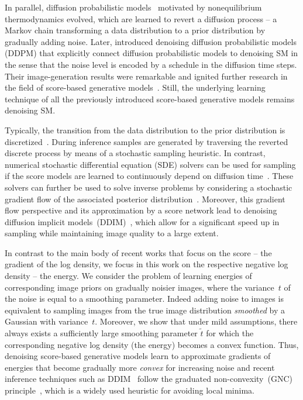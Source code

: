 \documentclass{article}
\theoremstyle{plain}
\theoremstyle{definition}
\theoremstyle{remark}
\begin{document}
In parallel, diffusion probabilistic models~\cite{SoJa15} motivated by nonequilibrium thermodynamics evolved, which are learned to revert a diffusion process -- a Markov chain transforming a data distribution to a prior distribution by gradually adding noise.
Later, \citet{HoJa20} introduced denoising diffusion probabilistic models (DDPM) that explicitly connect diffusion probabilistic models to denoising SM in the sense that the noise level is encoded by a schedule in the diffusion time steps.
Their image-generation results were remarkable and ignited further research in the field of score-based generative models~\cite{RoBl22,DiSa22,YaZh22,HoCh22}.
Still, the underlying learning technique of all the previously introduced score-based generative models remains denoising SM.

Typically, the transition from the data distribution to the prior distribution is discretized~\citep{HoJa20,SoEr19,SoEr20}.
During inference samples are generated by traversing the reverted discrete process by means of a stochastic sampling heuristic.
In contrast, numerical stochastic differential equation (SDE) solvers can be used for sampling if the score models are learned to continuously depend on diffusion time~\citep{SoSo21}.
These solvers can further be used to solve inverse problems by considering a stochastic gradient flow of the associated posterior distribution~\citep[Eq. (14)]{SoSo21}.
Moreover, this gradient flow perspective and its approximation by a score network lead to denoising diffusion implicit models~(DDIM)~\citep{SoMe22}, which allow for a significant speed up in sampling while maintaining image quality to a large extent.

In contrast to the main body of recent works that focus on the score -- the
gradient of the log density, we focus in this work on the respective
negative log density -- the energy. We consider the problem of
learning energies of corresponding image priors on gradually noisier images, where the variance~$t$ of the noise is equal to a smoothing parameter.
Indeed adding noise to images is equivalent to sampling images from the true image distribution \emph{smoothed} by a Gaussian with variance~$t$.
Moreover, we show that under mild assumptions, there always exists a
sufficiently large smoothing parameter $\widetilde{t}$ for which the
corresponding negative log density (the energy) becomes a convex function.
Thus, denoising score-based generative models learn to approximate gradients of energies that become gradually more \emph{convex} for
increasing noise and recent inference techniques such as DDIM~\citep{SoMe22} follow the graduated non-convexity~(GNC) principle~\citep{BlZi87}, which is a widely used heuristic for avoiding local minima.
\end{document}
